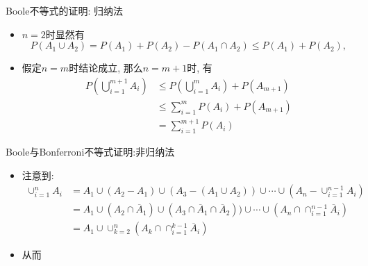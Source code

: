 \begin{frame}{{\rm Boole}不等式的证明: 归纳法}
 \begin{itemize}[<+-|alert@+>]
	\item $n=2$时显然有
	\[
	P\left(A_{1} \cup A_{2}\right)=P\left(A_{1}\right)+P\left(A_{2}\right)-P\left(A_{1} \cap A_{2}\right) \leqslant P\left(A_{1}\right)+P\left(A_{2}\right),
	\]
	\item 假定$n=m$时结论成立, 那么$n=m+1$时, 有
	\begin{align*}
	P(\bigcup_{i=1}^{m+1} A_{i})  &\leq P(\bigcup_{i=1}^{m} A_{i})+P(A_{m+1}) \\
	&\leqslant \sum_{i=1}^{m} P(A_{i})+P(A_{m+1}) \\
	& =\sum_{i=1}^{m+1} P(A_{i})
	\end{align*}


 \end{itemize}



\end{frame}

\begin{frame}{{\rm Boole}与{\rm Bonferroni}不等式证明:非归纳法}
\begin{itemize}[<+-|alert@+>]
	\item 注意到:
	\begin{align*}
	  \cup_{i=1}^nA_i&=A_1\cup (A_2-A_1)\cup(A_3-(A_1\cup A_2))\cup\cdots\cup(A_n-\cup_{i=1}^{n-1} A_i) \\
	   &=A_1\cup (A_2\cap \overline{A}_1)\cup(A_3\cap \overline{A}_1\cap \overline{A}_2))\cup\cdots\cup(A_n\cap \cap_{i=1}^{n-1} \overline{A}_i)\\
	   &=A_1\cup \cup_{k=2}^n (A_k\cap \cap_{i=1}^{k-1} \overline{A}_i)
	\end{align*}
	\item 从而
\end{itemize}

\end{frame}








